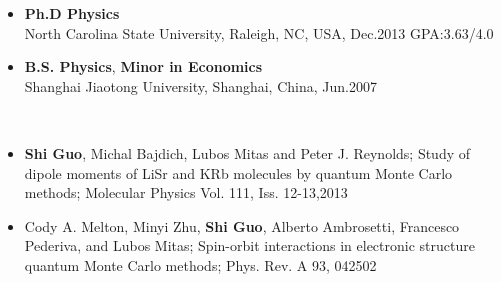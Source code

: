 \documentclass[11pt]{article} %
\begin{document}
\begin{itemize}
  \item {\bf Ph.D Physics} \hspace{100mm}   \\
    North Carolina State University, Raleigh, NC, USA, Dec.2013   \hspace*{10mm}GPA:3.63/4.0\\
\vspace{-4mm}
  \item {\bf B.S. Physics}, {\bf Minor in Economics}\\
    Shanghai Jiaotong University, Shanghai, China, Jun.2007\\
\vspace{-4mm}
\end{itemize}

\vspace{1mm}
\\
\vspace{-4mm}
\begin{itemize}
  \item {\bf Shi Guo}, Michal Bajdich, Lubos Mitas and Peter J. Reynolds;
Study of dipole moments of LiSr and KRb molecules by quantum Monte Carlo methods;
Molecular Physics Vol. 111, Iss. 12-13,2013
  \item Cody A. Melton, Minyi Zhu, {\bf Shi Guo}, Alberto Ambrosetti, Francesco Pederiva, and Lubos Mitas;
Spin-orbit interactions in electronic structure quantum Monte Carlo methods;
Phys. Rev. A 93, 042502
\end{itemize}
\vspace{-12mm}  
\end{document}
